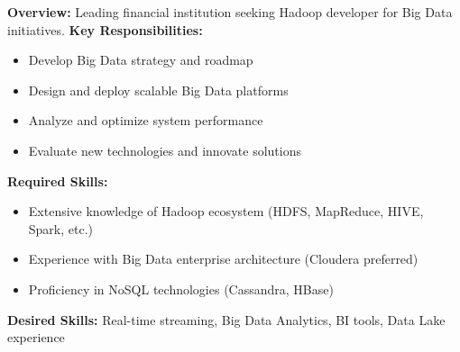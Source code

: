 \begin{tcolorbox}[colback=gray!5,colframe=blue!75!black, title=Vacancy Posting Snippet - Hadoop Developer, label=box:vacancy_posting]
\small
\textbf{Overview:} Leading financial institution seeking Hadoop developer for Big Data initiatives.
\textbf{Key Responsibilities:}
\begin{itemize}
\item Develop Big Data strategy and roadmap
\item Design and deploy scalable Big Data platforms
\item Analyze and optimize system performance
\item Evaluate new technologies and innovate solutions
\end{itemize}
\textbf{Required Skills:}
\begin{itemize}
\item Extensive knowledge of Hadoop ecosystem (HDFS, MapReduce, HIVE, Spark, etc.)
\item Experience with Big Data enterprise architecture (Cloudera preferred)
\item Proficiency in NoSQL technologies (Cassandra, HBase)
\end{itemize}
\textbf{Desired Skills:} Real-time streaming, Big Data Analytics, BI tools, Data Lake experience
\end{tcolorbox} 
